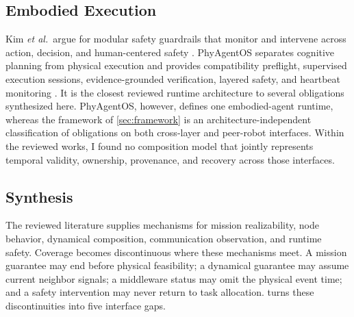 \subsection{Embodied Execution}

Kim \emph{et al.}\ argue for modular safety guardrails that monitor and
intervene across action, decision, and human-centered safety
\cite{kim2026guardrails}.  PhyAgentOS separates cognitive planning from physical
execution and provides compatibility preflight, supervised execution sessions,
evidence-grounded verification, layered safety, and heartbeat monitoring
\cite{liu2026phyagentos}.  It is the closest reviewed runtime architecture to
several obligations synthesized here.  PhyAgentOS, however, defines one
embodied-agent runtime, whereas the framework of \cref{sec:framework} is an
architecture-independent classification of obligations on both cross-layer and
peer-robot interfaces.  Within the reviewed works, I found no composition model
that jointly represents temporal validity, ownership, provenance, and recovery
across those interfaces.

\subsection{Synthesis}

The reviewed literature supplies mechanisms for mission realizability, node
behavior, dynamical composition, communication observation, and runtime safety.
Coverage becomes discontinuous where these mechanisms meet.  A mission guarantee
may end before physical feasibility; a dynamical guarantee may assume current
neighbor signals; a middleware status may omit the physical event time; and a
safety intervention may never return to task allocation.  
turns these discontinuities into five interface gaps.
